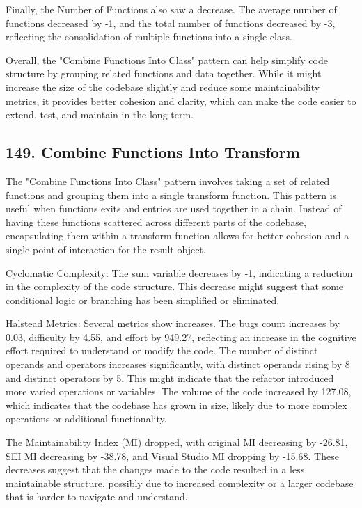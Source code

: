 Finally, the Number of Functions also saw a decrease. The average number of functions decreased by -1, and the total number of functions decreased by -3, reflecting the consolidation of multiple functions into a single class.

Overall, the "Combine Functions Into Class" pattern can help simplify code structure by grouping related functions and data together. While it might increase the size of the codebase slightly and reduce some maintainability metrics, it provides better cohesion and clarity, which can make the code easier to extend, test, and maintain in the long term.

\subsection{149. Combine Functions Into Transform}

The "Combine Functions Into Class" pattern involves taking a set of related functions and grouping them into a single transform function.
This pattern is useful when functions exits and entries are used together in a chain. Instead of having these functions scattered across different parts of the codebase, encapsulating them within a transform function allows for better cohesion and a single point of interaction for the result object.

Cyclomatic Complexity: The sum variable decreases by -1, indicating a reduction in the complexity of the code structure. This decrease might suggest that some conditional logic or branching has been simplified or eliminated.

Halstead Metrics: Several metrics show increases. The bugs count increases by 0.03, difficulty by 4.55, and effort by 949.27, reflecting an increase in the cognitive effort required to understand or modify the code. The number of distinct operands and operators increases significantly, with distinct operands rising by 8 and distinct operators by 5. This might indicate that the refactor introduced more varied operations or variables. The volume of the code increased by 127.08, which indicates that the codebase has grown in size, likely due to more complex operations or additional functionality.

The Maintainability Index (MI) dropped, with original MI decreasing by -26.81, SEI MI decreasing by -38.78, and Visual Studio MI dropping by -15.68. These decreases suggest that the changes made to the code resulted in a less maintainable structure, possibly due to increased complexity or a larger codebase that is harder to navigate and understand.

